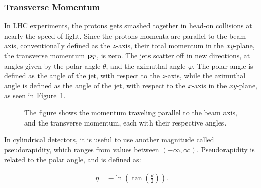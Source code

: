 \documentclass[12pt,a4paper]{article}
\numberwithin{equation}{section}
\begin{document}
\subsubsection{Transverse Momentum}\label{sec:transmomentum}
In LHC experiments, the protons gets smashed together in head-on collisions at
nearly the speed of light. Since the protons momenta are parallel to the beam
axis, conventionally defined as the $z$-axis, their total momentum in the
$xy$-plane, the transverse momentum $\vb p_T$, is zero. The jets scatter off in
new directions, at angles given by the polar angle $\theta$, and the azimuthal angle
$\varphi$. The polar angle is defined as the angle of the jet, with respect to the
$z$-axis, while the azimuthal angle is defined as the angle of the jet, with
respect to the $x$-axis in the $xy$-plane, as seen in Figure~\ref{fig:momentum}.

\begin{figure}[H]
  \centering
  \caption{The figure shows the momentum traveling parallel to the beam axis, and
  the transverse momentum, each with their respective angles.\label{fig:momentum}}
\end{figure}

In cylindrical detectors, it is useful to use another magnitude called
pseudorapidity, which ranges from values between $(-\infty, \infty)$. Pseudorapidity is
related to the polar angle, and is defined as:

\begin{align}
\label{eq:pseudorapidity}
\eta = -\ln({\tan\left(\frac{\theta}{2}\right)}).
\end{align}
\end{document}

